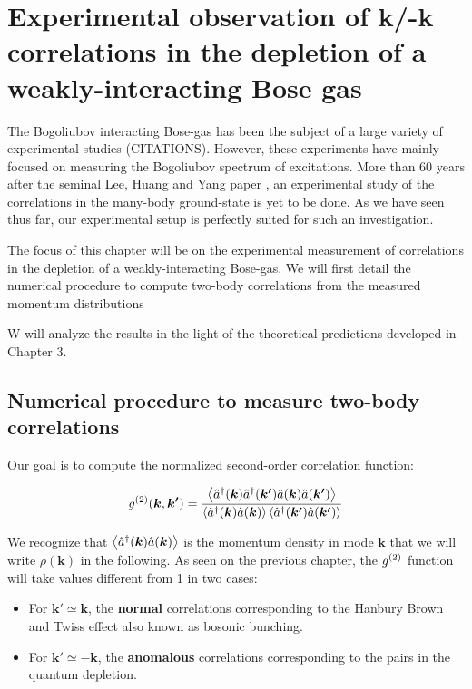 \chapter{Experimental observation of k/-k correlations in the depletion of a weakly-interacting Bose gas}

The Bogoliubov interacting Bose-gas has been the subject of a large variety of experimental studies (CITATIONS). However, these experiments have mainly focused on measuring the Bogoliubov spectrum of excitations. More than 60 years after the seminal Lee, Huang and Yang paper \cite{lee1957}, an experimental study of the correlations in the many-body ground-state is yet to be done. As we have seen thus far, our experimental setup is perfectly suited for such an investigation. 

The focus of this chapter will be on the experimental measurement of \kmk correlations in the depletion of a weakly-interacting Bose-gas. We will first detail the numerical procedure to compute two-body correlations from the measured momentum distributions 

W will analyze the results in the light of the theoretical predictions developed in Chapter 3. 

\section{Numerical procedure to measure two-body correlations}

Our goal is to compute the normalized second-order correlation function:

\begin{equation}
    g^{(2)} (\bm{k},\bm{k'}) = \frac{\left\langle\hat{a}^{\dagger}(\bm{k}) \hat{a}^{\dagger}(\bm{k'}) \hat{a}(\bm{k}) \hat{a}(\bm{k'})\right\rangle}{\left\langle\hat{a}^{\dagger}(\bm{k}) \hat{a}(\bm{k}) \right\rangle \left\langle\hat{a}^{\dagger}(\bm{k'}) \hat{a}(\bm{k'}) \right\rangle}
\end{equation}

We recognize that $\left\langle\hat{a}^{\dagger}(\bm{k}) \hat{a}(\bm{k})\right\rangle$ is the momentum density in mode $\bm{k}$ that we will write $\rho(\bm{k})$ in the following. As seen on the previous chapter, the $g^{(2)}$ function will take values different from 1 in two cases:

\begin{itemize}
    \item For $\bm{k'} \simeq \bm{k}$, the \textbf{normal} correlations corresponding to the Hanbury Brown and Twiss effect also known as bosonic bunching.
    \item For $\bm{k'} \simeq -\bm{k}$, the \textbf{anomalous} correlations corresponding to the \kmk pairs in the quantum depletion.
\end{itemize}

